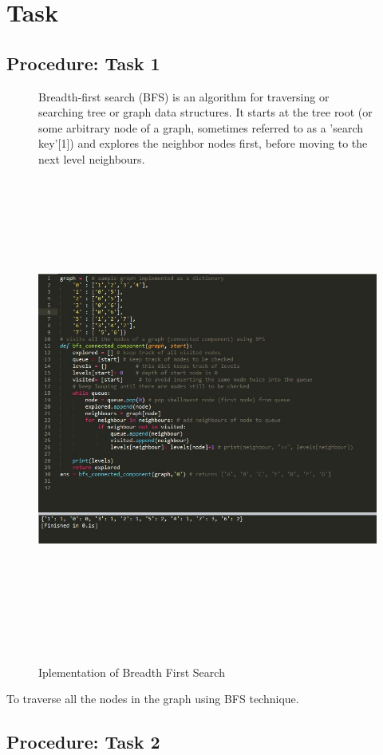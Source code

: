\documentclass[11pt]{article}            %
\begin{document}
\section{Task}  
\subsection{Procedure: Task 1 }     

\begin{figure}Breadth-first search (BFS) is an algorithm for traversing or searching tree or graph data structures. It starts at the tree root (or some arbitrary node of a graph, sometimes referred to as a 'search key'[1]) and explores the neighbor nodes first, before moving to the next level neighbours.
\centering
  \includegraphics[width=35cm,height=16cm,keepaspectratio]{3.jpg}
\caption{Iplementation of Breadth First Search}
\label{Figure:3}    
\end{figure}
To traverse all the nodes in the graph using BFS technique.

\subsection{Procedure: Task 2 }     
\end{document}
